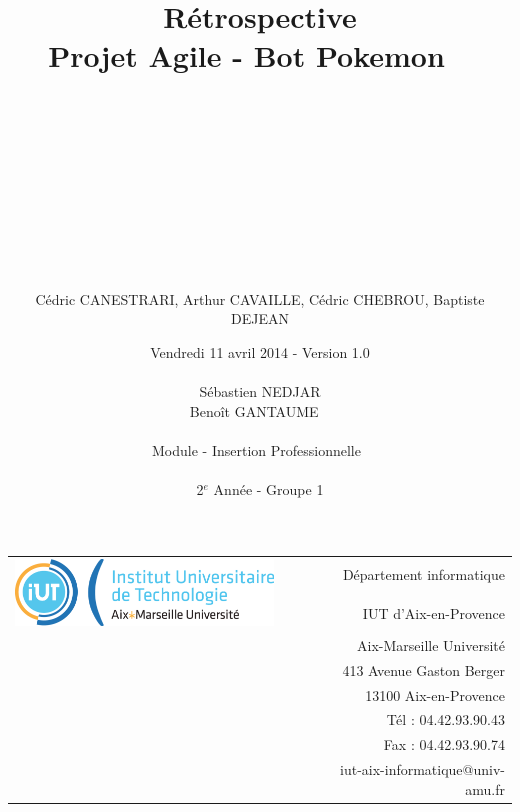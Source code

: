\documentclass[12pt]{article}
\begin{document}
\title{ ~\\~\\~\\Rétrospective\\\small{Projet Agile - Bot Pokemon} ~\\~\\ ~\\~\\~\\~\\}

\author{Cédric CANESTRARI, Arthur CAVAILLE, Cédric CHEBROU, Baptiste DEJEAN}
\date{Vendredi 11 avril 2014 - Version 1.0\\
	~\\
	Sébastien NEDJAR\\
	Benoît GANTAUME
	~\\
	~\\Module - Insertion Professionnelle~\\
	~\\2$^e$ Année - Groupe 1
	}
\footnotesize{
	\begin{tabular}{lp{2cm}r}
		  \multirow{2}{*}{\includegraphics[width=7cm]{LOGO-IUT-AMU.png}} && Département informatique \\
            && IUT d'Aix-en-Provence \\
            && Aix-Marseille Université \\
            && 413 Avenue Gaston Berger \\
            && 13100 Aix-en-Provence \\
            && Tél : 04.42.93.90.43 \\
            && Fax : 04.42.93.90.74 \\
            && iut-aix-informatique@univ-amu.fr 
    	\end{tabular}
}{\let\newpage\relax\maketitle} %
\newpage
{} %
\end{document}
